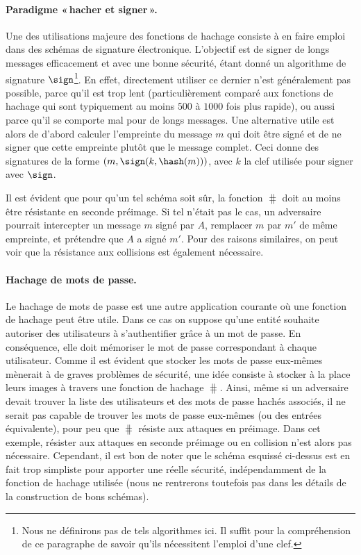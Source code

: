 \paragraph{Paradigme «\,hacher et signer\,».}
Une des utilisations majeure des fonctions de hachage consiste à en faire emploi dans des schémas de signature électronique.
L'objectif est de signer de longs messages efficacement et avec une bonne sécurité, étant donné un algorithme de signature
$\sign$\footnote{Nous ne définirons pas de tels algorithmes ici. Il suffit pour la compréhension de ce paragraphe
de savoir qu'ils nécessitent l'emploi d'une clef.}. En effet, directement utiliser ce dernier n'est généralement pas possible, parce qu'il est trop lent (particulièrement
comparé aux fonctions de hachage qui sont typiquement au moins $500$ à $1000$ fois plus rapide), ou aussi parce qu'il se comporte mal
pour de longs messages. Une alternative utile est alors de d'abord calculer l'empreinte du message $m$
qui doit être signé
et de ne signer que cette empreinte plutôt que le message complet.
Ceci donne des signatures de la forme $(m, \sign(k,\hash(m)))$, avec $k$ la clef utilisée pour signer avec $\sign$. 

Il est évident que pour qu'un tel schéma soit sûr, la fonction $\hash$ doit au moins être résistante en seconde préimage. Si tel n'était pas le cas, un adversaire
pourrait intercepter un message $m$ signé par $A$, remplacer $m$ par $m'$ de même empreinte, et prétendre que $A$ a signé $m'$.
Pour des raisons similaires, on peut voir que la résistance aux collisions est également nécessaire.

\paragraph{Hachage de mots de passe.} Le hachage de mots de passe est une autre application courante où une fonction
de hachage peut être utile. Dans ce cas
on suppose qu'une entité souhaite autoriser des utilisateurs à s'authentifier grâce à un mot de passe.
En conséquence, elle doit mémoriser le mot de passe correspondant à chaque utilisateur. Comme il est évident que stocker les mots
de passe eux-mêmes mènerait à de graves problèmes de sécurité, une idée consiste à stocker à la place leurs images à travers une fonction
de hachage $\hash$. Ainsi, même si un adversaire devait trouver la liste des utilisateurs et des mots de passe hachés associés, il ne serait
pas capable de trouver les mots de passe eux-mêmes (ou des entrées équivalente), pour peu que $\hash$ résiste aux attaques en préimage.
Dans cet exemple, résister aux attaques en seconde préimage ou en collision n'est alors pas nécessaire. Cependant, il est bon de noter
que le schéma esquissé ci-dessus est en fait trop simpliste pour apporter une réelle sécurité, indépendamment de la fonction de hachage
utilisée (nous ne rentrerons toutefois pas dans les détails de la construction de bons schémas).

